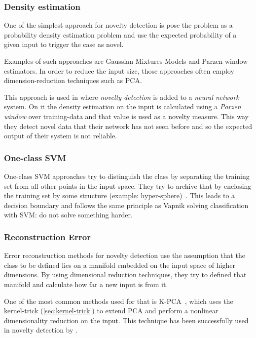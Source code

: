 \subsubsection*{Density estimation}
One of the simplest approach for novelty detection is pose the problem as a
probability density estimation problem and use the expected probability of a
given input to trigger the case as novel.

Examples of such approaches are Gaussian Mixtures Models and Parzen-window estimators.
In order to reduce the input size, those approaches often employ
dimension-reduction techniques such as \gls{PCA}.

This approach is used in \cite{bishop1994novelty} where \emph{novelty detection}
is added to a \emph{neural network} system. On it the density estimation on the
input is calculated using a \emph{Parzen window} over training-data and that
value is used as a novelty measure. This way they detect novel data that their
network has not seen before and so the expected output of their system is not
reliable.

\subsubsection*{One-class {SVM}}
One-class \gls{SVM} approaches try to distinguish the class by separating the
training set from all other points in the input space. They try to archive that
by enclosing the training set by some structure (example: hyper-sphere)~\citep{scholkopf2000support}.
This leads to a decision boundary and follows the same principle as Vapnik
solving classification with \gls{SVM}: do not solve something harder.

\subsubsection*{Reconstruction Error}
Error reconstruction methods for novelty detection use the assumption that the
class to be defined lies on a manifold embedded on the input space of higher
dimensions.
By using dimensional reduction techniques, they try to defined that manifold
and calculate how far a new input is from it.

\label{sec:kernel-pca}
One of the most common methods used for that is
\gls{K-PCA}~\citep{scholkopf1997kernel}, which uses the kernel-trick
(\autoref{sec:kernel-trick}) to extend \gls{PCA} and perform a nonlinear
dimensionality reduction on the input. This technique has been successfully
used in novelty detection by \cite{Hoffmann2007863}.



